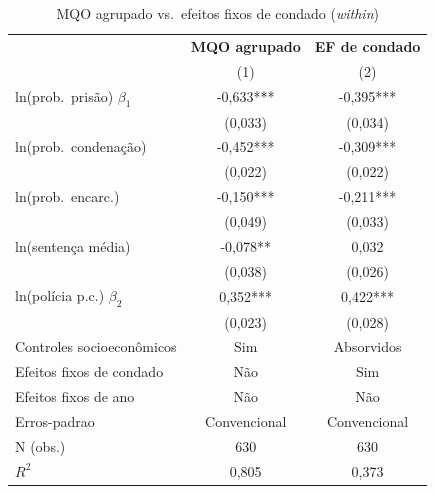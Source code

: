 \begin{table}[htbp]\centering
\caption{MQO agrupado vs.\ efeitos fixos de condado (\textit{within})}\label{tab:q3_fe_condado}
\small
\begin{tabular}{lcc}
\toprule
 & \textbf{MQO agrupado} & \textbf{EF de condado} \\
 & (1) & (2) \\
\midrule
ln(prob.\ pris\~ao) $\beta_1$ & -0,633*** & -0,395*** \\
 & (0,033) & (0,034) \\
ln(prob.\ condena\c{c}\~ao) & -0,452*** & -0,309*** \\
 & (0,022) & (0,022) \\
ln(prob.\ encarc.) & -0,150*** & -0,211*** \\
 & (0,049) & (0,033) \\
ln(senten\c{c}a m\'edia) & -0,078** & 0,032 \\
 & (0,038) & (0,026) \\
ln(pol\'icia p.c.) $\beta_2$ & 0,352*** & 0,422*** \\
 & (0,023) & (0,028) \\
\midrule
Controles socioecon\^omicos & Sim & Absorvidos \\
Efeitos fixos de condado & N\~ao & Sim \\
Efeitos fixos de ano & N\~ao & N\~ao \\
Erros-padrao & Convencional & Convencional \\
N (obs.) & 630 & 630 \\
$R^2$ & 0,805 & 0,373 \\
\bottomrule
\end{tabular}
\par{}
\end{table}
